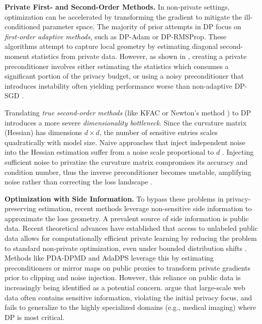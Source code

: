 \documentclass{article}
\theoremstyle{plain}
\theoremstyle{definition}
\theoremstyle{remark}
\begin{document}
\textbf{Private First- and Second-Order Methods.} In non-private settings, optimization can be accelerated by transforming the gradient to mitigate the ill-conditioned parameter space. The majority of prior attempts in DP focus on \textit{first-order adaptive methods}, such as DP-Adam or DP-RMSProp. These algorithms attempt to capture local geometry by estimating diagonal second-moment statistics from private data. However, as shown in \citet{ganesh2025designprinciplesprivateadaptive}, creating a private preconditioner involves either estimating the statistics which consumes a significant portion of the privacy budget, or using a noisy preconditioner that introduces instability often yielding performance worse than non-adaptive DP-SGD \cite{chen2020understanding}.

Translating \textit{true second-order methods} (like KFAC \citet{DBLP:journals/corr/MartensG15} or Newton's method \citet{ganesh2023faster}) to DP introduces a more severe \textit{dimensionality bottleneck}. Since the curvature matrix (Hessian) has dimensions $d \times d$, the number of sensitive entries scales quadratically with model size. Naive approaches that inject independent noise into the Hessian estimation suffer from a noise scale proportional to $d$ \cite{avellamedina2023differentiallyprivateinferencenoisy}. Injecting sufficient noise to privatize the curvature matrix compromises its accuracy and condition number, thus the inverse preconditioner becomes unstable, amplifying noise rather than correcting the loss landscape \cite{ganesh2023faster}.

\textbf{Optimization with Side Information.}
To bypass these problems in privacy-preserving estimation, recent methods leverage non-sensitive side information to approximate the loss geometry. A prevalent source of side information is public data.  Recent theoretical advances have established that access to unlabeled public data allows for computationally efficient private learning by reducing the problem to standard non-private optimization, even under bounded distribution shifts \cite{block2024oracle}. Methods like PDA-DPMD \cite{Amid2022} and AdaDPS \cite{Li2022} leverage this by estimating preconditioners or mirror maps on public proxies to transform private gradients prior to clipping and noise injection. However, this reliance on public data is increasingly being identified as a potential concern. \citet{Tramer2024} argue that large-scale web data often contains sensitive information, violating the initial privacy focus, and fails to generalize to the highly specialized domains (e.g., medical imaging) where DP is most critical.
\end{document}
